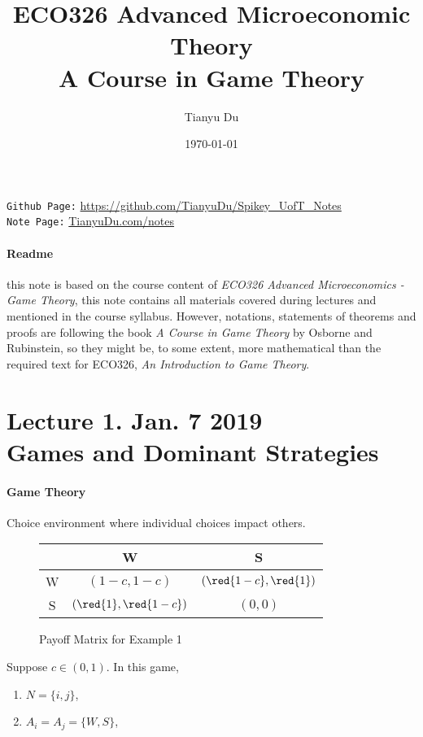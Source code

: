 \documentclass[11pt]{article}
\title{ECO326 Advanced Microeconomic Theory \\ \small A Course in Game Theory}
\author{Tianyu Du}
\date{\today}
\begin{document}
	\maketitle
	\doclicenseThis
	\texttt{Github Page:} \url{https://github.com/TianyuDu/Spikey_UofT_Notes}\\
	\texttt{Note Page:} \url{TianyuDu.com/notes}
	\paragraph{Readme} this note is based on the course content of \emph{ECO326 Advanced Microeconomics - Game Theory}, this note contains all materials covered during lectures and mentioned in the course syllabus. However, notations, statements of theorems and proofs are following the book \emph{A Course in Game Theory} by Osborne and Rubinstein, so they might be, to some extent, more mathematical than the required text for ECO326, \emph{An Introduction to Game Theory}.
	
	\tableofcontents
	\newpage
	
	\section{Lecture 1. Jan. 7 2019\\Games and Dominant Strategies}
		\paragraph{Game Theory} Choice environment where individual choices impact others.
		
		\begin{example}
			\begin{figure}[h]
				\centering
				  \begin{tabular}{c|c|c}
				    & W & S\\
				    \hline
				    W & $(1-c, 1-c)$ & $(\red{1-c}, \red{1})$ \\
				    \hline
				    S & $(\red{1}, \red{1-c})$ & $(0, 0)$
				  \end{tabular}
				  \caption{Payoff Matrix for Example 1}
			\end{figure}
		\end{example}
		Suppose $c \in (0, 1)$. In this game,
		\begin{enumerate}[i]
			\item $N = \{i, j\}$,
			\item $A_i = A_j = \{W, S\}$,
		\end{enumerate}
		
\end{document}
